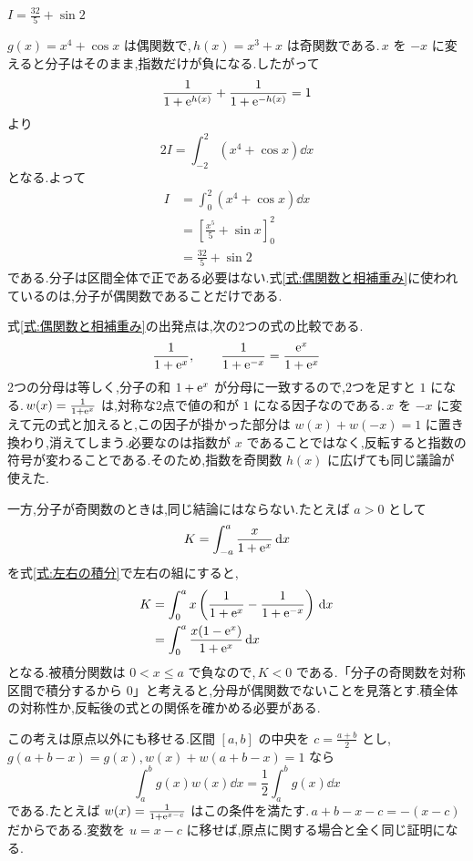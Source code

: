 $I=\frac{32}{5}+\sin2$

$g(x)=x^4+\cos x$ は偶関数で,\,$h(x)=x^3+x$ は奇関数である.\,$x$ を $-x$ に変えると分子はそのまま,指数だけが負になる.したがって
\[
\frac{1}{1+\mathrm{e}^{h(x)}}+\frac{1}{1+\mathrm{e}^{-h(x)}}=1
\]
より
\[
2I=\int_{-2}^2(x^4+\cos x)\dd x
\]
となる.よって
\[
\begin{aligned}
I&=\int_0^2(x^4+\cos x)\dd x\\
 &=\left[\frac{x^5}{5}+\sin x\right]_0^2\\
 &=\frac{32}{5}+\sin2
\end{aligned}
\]
である.分子は区間全体で正である必要はない.式\eqref{式:偶関数と相補重み}に使われているのは,分子が偶関数であることだけである.

式\eqref{式:偶関数と相補重み}の出発点は,次の2つの式の比較である.
\[
\frac{1}{1+\mathrm{e}^x},\qquad
\frac{1}{1+\mathrm{e}^{-x}}=\frac{\mathrm{e}^x}{1+\mathrm{e}^x}
\]
2つの分母は等しく,分子の和 $1+\mathrm{e}^x$ が分母に一致するので,2つを足すと $1$ になる.\,$w(x)=\frac{1}{1+\mathrm{e}^x}$ は,対称な2点で値の和が $1$ になる因子なのである.\,$x$ を $-x$ に変えて元の式と加えると,この因子が掛かった部分は $w(x)+w(-x)=1$ に置き換わり,消えてしまう.必要なのは指数が $x$ であることではなく,反転すると指数の符号が変わることである.そのため,指数を奇関数 $h(x)$ に広げても同じ議論が使えた.

一方,分子が奇関数のときは,同じ結論にはならない.たとえば $a>0$ として
\[
K=\int_{-a}^a\frac{x}{1+\mathrm{e}^x}\,\mathrm{d} x
\]
を式\eqref{式:左右の積分}で左右の組にすると,
\[
\begin{aligned}
K&=\int_0^a x\left(\frac{1}{1+\mathrm{e}^x}-\frac{1}{1+\mathrm{e}^{-x}}\right)\,\mathrm{d} x\\
 &=\int_0^a\frac{x(1-\mathrm{e}^x)}{1+\mathrm{e}^x}\,\mathrm{d} x
\end{aligned}
\]
となる.被積分関数は $0<x\le a$ で負なので,\,$K<0$ である.「分子の奇関数を対称区間で積分するから $0$」と考えると,分母が偶関数でないことを見落とす.積全体の対称性か,反転後の式との関係を確かめる必要がある.

この考えは原点以外にも移せる.区間 $[a,b]$ の中央を $c=\frac{a+b}{2}$ とし,\,$g(a+b-x)=g(x)$,\,$w(x)+w(a+b-x)=1$ なら
\[
\int_a^b g(x)w(x)\dd x=\frac12\int_a^b g(x)\dd x
\]
である.たとえば $w(x)=\frac{1}{1+\mathrm{e}^{x-c}}$ はこの条件を満たす.\,$a+b-x-c=-(x-c)$ だからである.変数を $u=x-c$ に移せば,原点に関する場合と全く同じ証明になる.
